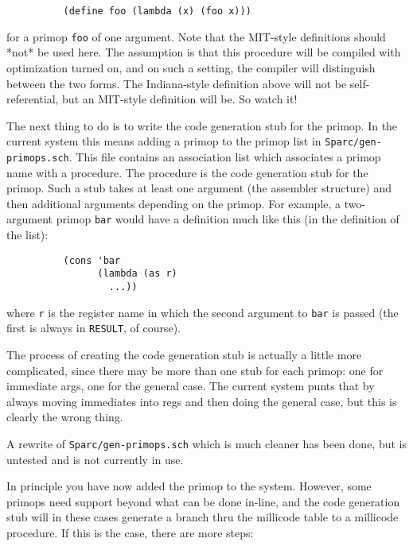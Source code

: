 \begin{verbatim}
          (define foo (lambda (x) (foo x)))
\end{verbatim}

for a primop {\tt foo} of one argument. Note that the MIT-style definitions
should *not* be used here. The assumption is that this procedure will be
compiled with optimization turned on, and on such a setting, the compiler
will distinguish between the two forms. The Indiana-style definition above
will not be self-referential, but an MIT-style definition will be. So watch
it!

The next thing to do is to write the code generation stub for the primop. In
the current system this means adding a primop to the primop list in
{\tt Sparc/gen-primops.sch}. This file contains an association list which
associates a primop name with a procedure. The procedure is the code generation
stub for the primop. Such a stub takes at least one argument (the assembler
structure) and then additional arguments depending on the primop. For
example, a two-argument primop {\tt bar} would have a definition much like
this (in the definition of the list):

\begin{minipage}{\linewidth}
\begin{verbatim}
          (cons 'bar
                (lambda (as r)
                  ...))
\end{verbatim}
\end{minipage}

where {\tt r} is the register name in which the second argument to {\tt bar}
is passed (the first is always in {\tt RESULT}, of course).

The process of creating the code generation stub is actually a little more
complicated, since there may be more than one stub for each primop: one
for immediate args, one for the general case. The current system punts that
by always moving immediates into regs and then doing the general case, but
this is clearly the wrong thing.

A rewrite of {\tt Sparc/gen-primops.sch} which is much cleaner has been
done, but is untested and is not currently in use.

In principle you have now added the primop to the system. However, some
primops need support beyond what can be done in-line, and the code
generation stub will in these cases generate a branch thru the millicode
table to a millicode procedure. If this is the case, there are more steps:

